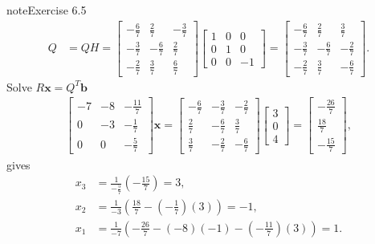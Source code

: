 \documentclass[letterpaper,10pt,english]{jupyterBook}
\begin{document}
\begin{sphinxadmonition}{note}{Exercise 6.5}
\begin{align*}
    Q &= Q H = \left[\begin{matrix}- \frac{6}{7} & \frac{2}{7} & - \frac{3}{7}\\- \frac{3}{7} & - \frac{6}{7} & \frac{2}{7}\\- \frac{2}{7} & \frac{3}{7} & \frac{6}{7}\end{matrix}\right]\left[\begin{matrix}1 & 0 & 0\\0 & 1 & 0\\0 & 0 & -1\end{matrix}\right] = \left[\begin{matrix}- \frac{6}{7} & \frac{2}{7} & \frac{3}{7}\\- \frac{3}{7} & - \frac{6}{7} & - \frac{2}{7}\\- \frac{2}{7} & \frac{3}{7} & - \frac{6}{7}\end{matrix}\right].
\end{align*}
\sphinxAtStartPar
Solve \(R \mathbf{{x}} = Q^T \mathbf{{b}}\)
\begin{align*}
    \left[\begin{matrix}-7 & -8 & - \frac{11}{7}\\0 & -3 & - \frac{1}{7}\\0 & 0 & - \frac{5}{7}\end{matrix}\right] \mathbf{x} = \left[\begin{matrix}- \frac{6}{7} & - \frac{3}{7} & - \frac{2}{7}\\\frac{2}{7} & - \frac{6}{7} & \frac{3}{7}\\\frac{3}{7} & - \frac{2}{7} & - \frac{6}{7}\end{matrix}\right]\left[\begin{matrix}3\\0\\4\end{matrix}\right] = \left[\begin{matrix}- \frac{26}{7}\\\frac{18}{7}\\- \frac{15}{7}\end{matrix}\right],
\end{align*}
\sphinxAtStartPar
gives
\begin{align*}
    x_{3} &= \frac{1}{- \frac{5}{7}} \left(- \frac{15}{7} \right) = 3, \\
    x_{2} &= \frac{1}{-3} \left(\frac{18}{7} - \left( - \frac{1}{7} \right) \left( 3 \right) \right) = -1, \\
    x_{1} &= \frac{1}{-7} \left(- \frac{26}{7} - \left( -8 \right) \left( -1 \right) - \left( - \frac{11}{7} \right) \left( 3 \right) \right) = 1.
\end{align*}\end{sphinxadmonition}
\end{document}
